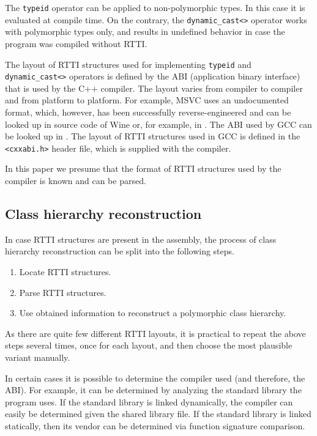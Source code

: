 \documentclass[10pt, conference]{IEEEtran}
\newcommand{\compact}{}
\begin{document}
The \lstinline{typeid} operator can be applied to non-polymorphic types.
In this case it is evaluated at compile time.
On the contrary, the \lstinline{dynamic_cast<>} operator works
with polymorphic types only, and results in undefined behavior
in case the program was compiled without RTTI.

The layout of RTTI structures used for implementing
\lstinline{typeid} and \lstinline{dynamic_cast<>} operators
is defined by the ABI (application binary interface) that is used by the C++ compiler.
The layout varies from compiler to compiler and from platform to platform.
For example, MSVC uses an undocumented format,
which, however, has been successfully reverse-engineered
and can be looked up in source code of Wine or, for example,
in \cite{skochinsky06}.
The ABI used by GCC can be looked up in \cite{gccabi}.
The layout of RTTI structures used in GCC is defined in
the \lstinline{<cxxabi.h>} header file, which is supplied with the compiler.

In this paper we presume that the format of RTTI structures
used by the compiler is known and can be parsed.



\quad

\subsection{Class hierarchy reconstruction}
In case RTTI structures are present in the assembly,
the process of class hierarchy reconstruction can be split
into the following steps.
\begin{enumerate}\compact
\item Locate RTTI structures.
\item Parse RTTI structures.
\item Use obtained information to reconstruct a polymorphic class hierarchy.
\end{enumerate}

As there are quite few different RTTI layouts,
it is practical to repeat the above steps several times,
once for each layout,
and then choose the most plausible variant manually.

In certain cases it is possible to determine the compiler used (and therefore, the ABI).
For example, it can be determined by analyzing the standard library
the program uses. If the standard library is linked dynamically,
the compiler can easily be determined given the shared library file.
If the standard library is linked statically, then
its vendor can be determined via function signature comparison. %
\end{document}
